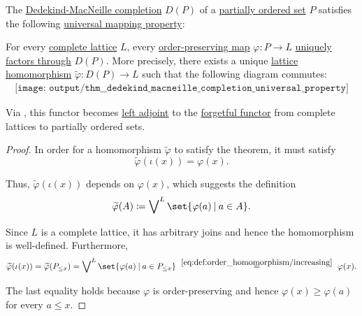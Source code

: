 \begin{theorem}\label{thm:dedekind_macneille_completion_universal_property}
  The \hyperref[def:dedekind_macnielle_completion]{Dedekind-MacNeille completion} \( D(P) \) of a \hyperref[def:partially_ordered_set]{partially ordered set} \( P \) satisfies the following \hyperref[rem:universal_mapping_property]{universal mapping property}:
  \begin{displayquote}
    For every \hyperref[def:semilattice/lattice]{complete lattice} \( L \), every \hyperref[def:order_homomorphism/increasing]{order-preserving map} \( \varphi: P \to L \) \hyperref[def:factors_through]{uniquely factors through} \( D(P) \). More precisely, there exists a unique \hyperref[def:semilattice/homomorphism]{lattice homomorphism} \( \widetilde{\varphi}: D(P) \to L \) such that the following diagram commutes:
    \begin{equation}\label{eq:thm:dedekind_macneille_completion_universal_property/diagram}
      \begin{aligned}
        \texttt{[image: output/thm\_\_dedekind\_macneille\_completion\_universal\_property]}
      \end{aligned}
    \end{equation}
  \end{displayquote}
\end{theorem}
\begin{comments}
  \item Via , this functor becomes \hyperref[def:category_adjunction]{left adjoint} to the \hyperref[def:concrete_category]{forgetful functor} from complete lattices to partially ordered sets.
\end{comments}
\begin{proof}
  In order for a homomorphism \( \widetilde{\varphi} \) to satisfy the theorem, it must satisfy
  \begin{equation*}
    \widetilde{\varphi}(\iota(x)) = \varphi(x).
  \end{equation*}

  Thus, \( \widetilde{\varphi}(\iota(x)) \) depends on \( \varphi(x) \), which suggests the definition
  \begin{equation*}
    \widetilde{\varphi}(A) \coloneqq \bigvee\nolimits^L \set{ \varphi(a) \given a \in A }.
  \end{equation*}

  Since \( L \) is a complete lattice, it has arbitrary joins and hence the homomorphism is well-defined. Furthermore,
  \begin{equation*}
    \widetilde{\varphi}(\iota(x))
    =
    \widetilde{\varphi}(P_{\leq x})
    =
    \bigvee\nolimits^L \set{ \varphi(a) \given a \in P_{\leq x} }
    \reloset {\eqref{eq:def:order_homomorphism/increasing}} =
    \varphi(x).
  \end{equation*}

  The last equality holds because \( \varphi \) is order-preserving and hence \( \varphi(x) \geq \varphi(a) \) for every \( a \leq x \).
\end{proof}

